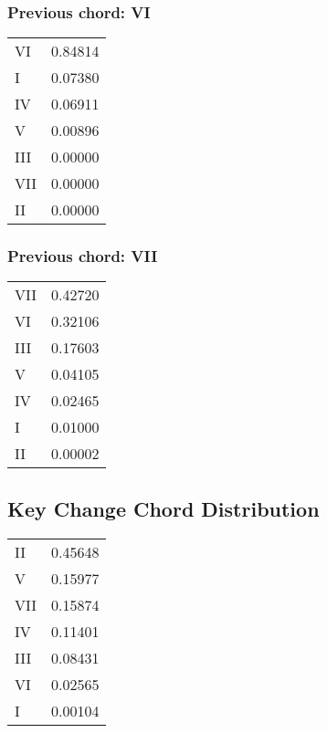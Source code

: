 \subsubsection*{Previous chord: VI}


\begin{tabular}{l l}
VI & 0.84814 \\
I & 0.07380 \\
IV & 0.06911 \\
V & 0.00896 \\
III & 0.00000 \\
VII & 0.00000 \\
II & 0.00000 \\
\end{tabular}


\subsubsection*{Previous chord: VII}


\begin{tabular}{l l}
VII & 0.42720 \\
VI & 0.32106 \\
III & 0.17603 \\
V & 0.04105 \\
IV & 0.02465 \\
I & 0.01000 \\
II & 0.00002 \\
\end{tabular}

\subsection{Key Change Chord Distribution}
\begin{tabular}{l l}
II & 0.45648 \\
V & 0.15977 \\
VII & 0.15874 \\
IV & 0.11401 \\
III & 0.08431 \\
VI & 0.02565 \\
I & 0.00104 \\
\end{tabular}
